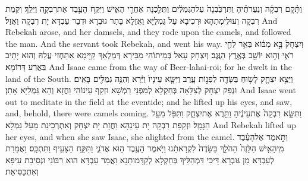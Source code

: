 {וַתָּ֨קׇם רִבְקָ֜ה וְנַעֲרֹתֶ֗יהָ וַתִּרְכַּ֙בְנָה֙ עַל\maqqaf הַגְּמַלִּ֔ים וַתֵּלַ֖כְנָה אַחֲרֵ֣י הָאִ֑ישׁ וַיִּקַּ֥ח הָעֶ֛בֶד אֶת\maqqaf רִבְקָ֖ה וַיֵּלַֽךְ׃}
{וְקַמַת רִבְקָה וְעוּלֵימְתַהָא וּרְכִיבָא עַל גַּמְלַיָּא וַאֲזַלָא בָּתַר גּוּבְרָא וּדְבַר עַבְדָּא יָת רִבְקָה וַאֲזַל׃}
{And Rebekah arose, and her damsels, and they rode upon the camels, and followed the man. And the servant took Rebekah, and went his way.}{}
{וְיִצְחָק֙ בָּ֣א מִבּ֔וֹא בְּאֵ֥ר לַחַ֖י רֹאִ֑י וְה֥וּא יוֹשֵׁ֖ב בְּאֶ֥רֶץ הַנֶּֽגֶב׃}
{וְיִצְחָק עָאל בְּמֵיתוֹהִי מִבֵּירָא דְּמַלְאַךְ קַיָּימָא אִתַּחְזִי עֲלַהּ וְהוּא יָתֵיב בַּאֲרַע דָּרוֹמָא׃}
{And Isaac came from the way of Beer-lahai-roi; for he dwelt in the land of the South.}{}
{וַיֵּצֵ֥א יִצְחָ֛ק לָשׂ֥וּחַ בַּשָּׂדֶ֖ה לִפְנ֣וֹת עָ֑רֶב וַיִּשָּׂ֤א עֵינָיו֙ וַיַּ֔רְא וְהִנֵּ֥ה גְמַלִּ֖ים בָּאִֽים׃}
{וּנְפַק יִצְחָק לְצַלָּאָה בְּחַקְלָא לְמִפְנֵי רַמְשָׁא וּזְקַף עֵינוֹהִי וַחֲזָא וְהָא גַּמְלַיָּא אָתַן׃}
{And Isaac went out to meditate in the field at the eventide; and he lifted up his eyes, and saw, and, behold, there were camels coming.}{}
{וַתִּשָּׂ֤א רִבְקָה֙ אֶת\maqqaf עֵינֶ֔יהָ וַתֵּ֖רֶא אֶת\maqqaf יִצְחָ֑ק וַתִּפֹּ֖ל מֵעַ֥ל הַגָּמָֽל׃}
{וּזְקַפַת רִבְקָה יָת עֵינַהָא וַחֲזָת יָת יִצְחָק וְאִתְרְכֵינַת מֵעַל גַּמְלָא׃}
{And Rebekah lifted up her eyes, and when she saw Isaac, she alighted from the camel.}{}
{וַתֹּ֣אמֶר אֶל\maqqaf הָעֶ֗בֶד מִֽי\maqqaf הָאִ֤ישׁ הַלָּזֶה֙ הַהֹלֵ֤ךְ בַּשָּׂדֶה֙ לִקְרָאתֵ֔נוּ וַיֹּ֥אמֶר הָעֶ֖בֶד ה֣וּא אֲדֹנִ֑י וַתִּקַּ֥ח הַצָּעִ֖יף וַתִּתְכָּֽס׃}
{וַאֲמַרַת לְעַבְדָּא מַן גּוּבְרָא דֵּיכִי דִּמְהַלֵּיךְ בְּחַקְלָא לְקַדָּמוּתַנָא וַאֲמַר עַבְדָּא הוּא רִבּוֹנִי וּנְסֵיבַת עִיפָא וְאִתְכַּסִּיאַת׃}
